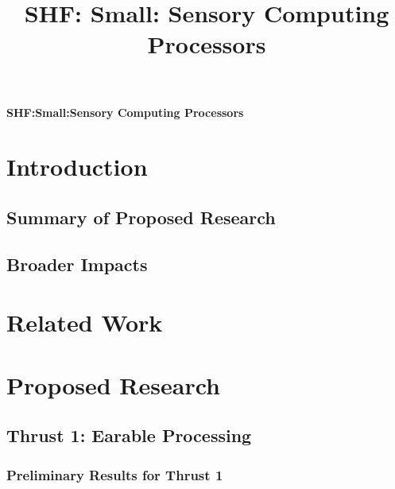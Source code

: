 \documentclass[11 pt]{article}
\title{SHF: Small: Sensory Computing Processors}
\begin{document}
\begin{center}
{\Large \textbf{SHF:Small:Sensory Computing Processors}}
\end{center}

\section{Introduction}


\subsection{Summary of Proposed Research}
\label{ssec:summary}


\subsection{Broader Impacts}


\section{Related Work}


\section{Proposed Research}


\subsection{Thrust 1: Earable Processing}
\label{sec:tract1}
\label{ssec:research1}


\subsubsection{Preliminary Results for Thrust 1}
\label{ssec:prelim1}

\end{document}
